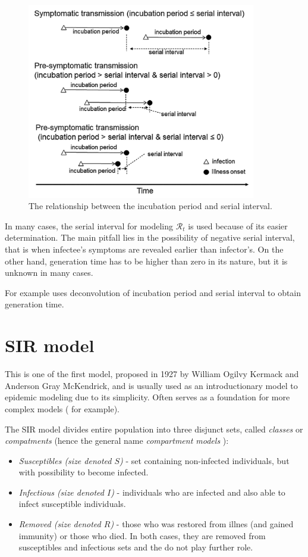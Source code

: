 \documentclass[
  digital, %
  oneside, %
  lof,     %
  lot,     %
]{fithesis4}
\begin{document}
\begin{figure}[h]
  \includegraphics[width=10cm]{static/images/nishiura2020_terms.png}
  \caption{The relationship between the incubation period and serial interval. \cite{nishiura2020}}
  \label{fig:nishiura-transmission}
\end{figure}

In many cases, the serial interval for modeling $\mathcal{R}_t$ 
is used because of its easier determination. 
The main pitfall lies in the possibility of negative serial 
interval, that is when infectee's symptoms are revealed 
earlier than infector's. 
On the other hand, generation time has to be higher than 
zero in its nature, but it is unknown in many cases. 

For example \cite{knight2020} uses deconvolution of incubation 
period and serial interval to obtain generation time.



\section{SIR model}

This is one of the first model, proposed in 1927 by 
William Ogilvy Kermack and Anderson Gray McKendrick, and is 
usually used as an introductionary model to epidemic 
modeling \cite{martcheva2015} due to its simplicity. 
Often serves as a foundation for more complex 
models (\cite{clancy2008} for example).

The SIR model divides entire population into three disjunct 
sets, called \textit{classes} or \textit{compatments} (hence the general 
name \textit{compartment models} \cite{bacaer2011}):

\begin{itemize}
  \item \textit{Susceptibles (size denoted $S$)} - set containing non-infected individuals, but with possibility to become infected.
  \item \textit{Infectious (size denoted $I$)} - individuals who are infected and also able to infect susceptible individuals.
  \item \textit{Removed (size denoted $R$)} - those who was restored from illnes (and gained immunity) or those who died. In both cases, they are removed from susceptibles and infectious sets and the do not play further role.
\end{itemize}
\end{document}
